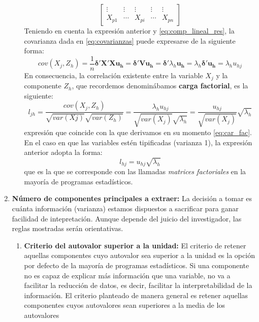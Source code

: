 \begin{enumerate}
\begin{enumerate}
\begin{equation}
\begin{bmatrix}
            \vdots & \vdots & \vdots & \vdots & \vdots \\
            X_{p1} & \cdots & X_{pi} & \cdots & X_{pn}
        \end{bmatrix}
        \end{equation}
        Teniendo en cuenta la expresión anterior y \eqref{eq:comp_lineal_res}, la covarianza dada en \eqref{eq:covarianzas} puede expresarse de la siguiente forma:
        \begin{equation}
            cov(X_j,Z_h)=\frac{1}{n}\mathbf{\delta'X'Xu_h}=\mathbf{\delta'Vu_h}=\mathbf{\delta'}\lambda_h\mathbf{u_h}=\lambda_h\mathbf{\delta'u_h}=\lambda_hu_{hj}
        \end{equation}
        En consecuencia, la correlación existente entre la variable $X_j$ y la componente $Z_h$, que recordemos denominábamos \textbf{carga factorial}, es la siguiente:
        \begin{equation}
            l_{jh}=\frac{cov(X_j,Z_h)}{\sqrt{var(Xj)}\sqrt{var(Z_h)}}=\frac{\lambda_hu_{hj}}{\sqrt{var(X_j)}\sqrt{\lambda_h}}=\frac{u_{hj}}{\sqrt{var(X_j)}}\sqrt{\lambda_h}
        \end{equation}
        expresión que coincide con la que derivamos en su momento \eqref{eq:car_fac}. En el caso en que las variables estén tipificadas (varianza 1), la expresión anterior adopta la forma:
        \begin{equation}
            l_{hj}=u_{hj}\sqrt{\lambda_h}
        \end{equation}
        que es la que se corresponde con las llamadas \textsl{matrices factoriales} en la mayoría de programas estadísticos.
    \end{enumerate}
    \item \textbf{Número de componentes principales a extraer:} La decisión a tomar es cuánta información (varianza) estamos dispuestos a sacrificar para ganar facilidad de intepretación. Aunque depende del juicio del investigador, las reglas mostradas serán orientativas.
    \begin{enumerate}
        \item \textbf{Criterio del autovalor superior a la unidad:} El criterio de retener aquellas componentes cuyo autovalor sea superior a la unidad es la opción por defecto de la mayoría de programas estadísticos. Si una componente no es capaz de explicar más información que una variable, no va a facilitar la reducción de datos, es decir, facilitar la interpretabilidad de la información. El criterio planteado de manera general es retener aquellas componentes cuyos autovalores sean superiores a la media de los autovalores

\end{enumerate}
\end{enumerate}
